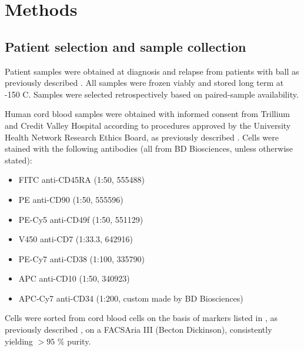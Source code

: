 \section{Methods}

\subsection{Patient selection and sample collection}
\label{sec:BALL_patient_selection}

Patient samples were obtained at diagnosis and relapse from patients with \gls{ball} as previously described \cite{dobsonRelapseFatedLatentDiagnosis2020}.
All samples were frozen viably and stored long term at -150 \textdegree C.
Samples were selected retrospectively based on paired-sample availability.

Human cord blood samples were obtained with informed consent from Trillium and Credit Valley Hospital according to procedures approved by the University Health Network Research Ethics Board, as previously described \cite{dobsonRelapseFatedLatentDiagnosis2020}.
Cells were stained with the following antibodies (all from BD Biosciences, unless otherwise stated):

\begin{itemize}
  \item FITC anti-CD45RA (1:50, 555488)
  \item PE anti-CD90 (1:50, 555596)
  \item PE-Cy5 anti-CD49f (1:50, 551129)
  \item V450 anti-CD7 (1:33.3, 642916)
  \item PE-Cy7 anti-CD38 (1:100, 335790)
  \item APC anti-CD10 (1:50, 340923)
  \item APC-Cy7 anti-CD34 (1:200, custom made by BD Biosciences)
\end{itemize}

Cells were sorted from cord blood cells on the basis of markers listed in , as previously described \cite{nottaIsolationSingleHuman2011}, on a FACSAria III (Becton Dickinson), consistently yielding $> 95$ \% purity.


